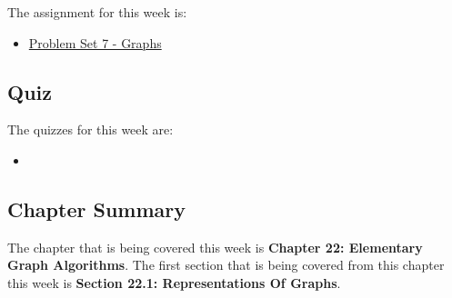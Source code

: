 The assignment for this week is:

\begin{itemize}
    \item \href{https://github.com/QuantumCompiler/CU/tree/main/CSPB%203104%20-%20Algorithms/Assignments/Problem%20Sets/Problem%20Set%207%20-%20Graphs}{Problem Set 7 - Graphs}
\end{itemize}

\subsection{Quiz}

The quizzes for this week are:

\begin{itemize}
    \item {}
\end{itemize}

\newpage

\subsection{Chapter Summary}

The chapter that is being covered this week is \textbf{Chapter 22: Elementary Graph Algorithms}. The first section that is being covered from this chapter this week is \textbf{Section 22.1: Representations Of Graphs}.

